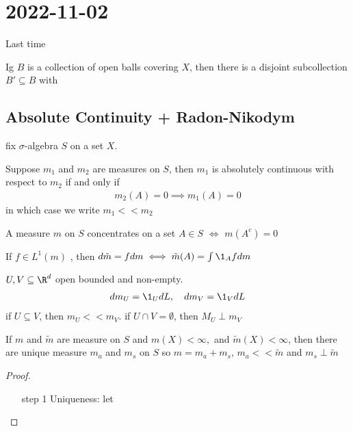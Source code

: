 \section{2022-11-02}

Last time

\begin{theorem}[Vitali]
	Ig $B$ is a collection of open balls covering $X$, then there is a disjoint subcollection $B' \subseteq B$ with 
\end{theorem}


\subsection{Absolute Continuity + Radon-Nikodym}

fix $\sigma$-algebra $S$ on a set $X$.


\begin{definition}
	Suppose $m_1$ and $m_{2}$ are measures on $S$, then $m_1$ is absolutely continuous with respect to $m_{2}$ if and only if 
	\begin{align*}
		m_{2} (A) = 0 \implies m_1 (A) = 0
	\end{align*} in which case we write $m_1 << m_2$
\end{definition}

\begin{definition}
	A measure $m$ on $S$ concentrates on a set $A \in S$ $\iff $ $m(A^{c}) = 0$
\end{definition}

\begin{remark}
	If $f \in L^{1} (m)$ , then $d\tilde{m} = f dm \iff \tilde{m} (A) = \int \1_{A}f dm$
\end{remark}


\begin{example}
	$U, V \subseteq  \R^{d}$ open bounded and non-empty.
	\begin{align*}
		d m_{U} = \1_{U} dL, \quad d m_{V} = \1_{V} dL
	\end{align*} if $U \subseteq V$, then $m_{U} << m_{V}$.
	if $U \cap V = \emptyset$, then $M_{U} \perp m_{V}$
\end{example}

\begin{theorem}
	If $m$ and $\tilde m$ are measure on  $S$ and  $m(X) < \infty,$ and $\tilde m (X) < \infty$, then there are unique measure $m_{a}$ and $m_{s}$ on $S$ so $m = m_{a} + m_{s}$, $m_{a} << \tilde m$ and $m_{s} \perp \tilde m$
\end{theorem}

\begin{proof}
	\begin{enumerate}
		\item[step 1] Uniqueness: let
	\end{enumerate}
\end{proof}

